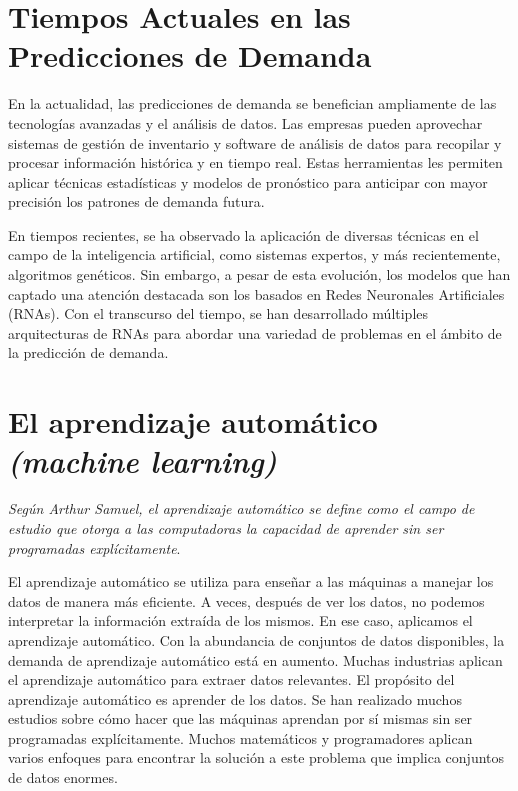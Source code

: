 \section{Tiempos Actuales en las Predicciones de Demanda}

En la actualidad, las predicciones de demanda se benefician ampliamente de las tecnologías avanzadas y el análisis de datos. Las empresas pueden aprovechar sistemas de gestión de inventario y software de análisis de datos para recopilar y procesar información histórica y en tiempo real. Estas herramientas les permiten aplicar técnicas estadísticas y modelos de pronóstico para anticipar con mayor precisión los patrones de demanda futura.

En tiempos recientes, se ha observado la aplicación de diversas técnicas en el campo de la inteligencia artificial, como sistemas expertos, y más recientemente, algoritmos genéticos. Sin embargo, a pesar de esta evolución, los modelos que han captado una atención destacada son los basados en Redes Neuronales Artificiales (RNAs). Con el transcurso del tiempo, se han desarrollado múltiples arquitecturas de RNAs para abordar una variedad de problemas en el ámbito de la predicción de demanda.

\section{El aprendizaje automático \textit{(machine learning)}}

\textit{Según Arthur Samuel, el aprendizaje automático se define como el campo de estudio que otorga a las computadoras la capacidad de aprender sin ser programadas explícitamente}\cite{mahesh2020machine}. 

El aprendizaje automático se utiliza para enseñar a las máquinas a manejar los datos de manera más eficiente. A veces, después de ver los datos, no podemos interpretar la información extraída de los mismos. En ese caso, aplicamos el aprendizaje automático. Con la abundancia de conjuntos de datos disponibles, la demanda de aprendizaje automático está en aumento. Muchas industrias aplican el aprendizaje automático para extraer datos relevantes. El propósito del aprendizaje automático es aprender de los datos. Se han realizado muchos estudios sobre cómo hacer que las máquinas aprendan por sí mismas sin ser programadas explícitamente. Muchos matemáticos y programadores aplican varios enfoques para encontrar la solución a este problema que implica conjuntos de datos enormes.

